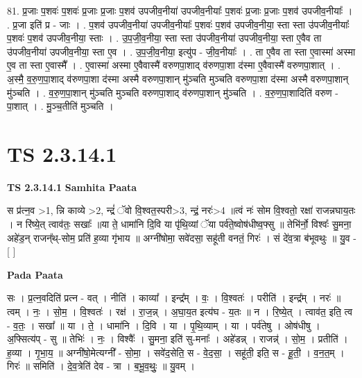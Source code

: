 \documentclass[17pt]{extarticle}
\begin{document}
81. प्र॒जाः प॒शवः॑ प॒शवः॑ प्र॒जाः प्र॒जाः प॒शव॑ उपजीव॒नीया॑ उपजीव॒नीयाः᳚ प॒शवः॑ प्र॒जाः प्र॒जाः प॒शव॑ उपजीव॒नीयाः᳚ । . प्र॒जा इति॑ प्र - जाः । . प॒शव॑ उपजीव॒नीया॑ उपजीव॒नीयाः᳚ प॒शवः॑ प॒शव॑ उपजीव॒नीया॒ स्ता स्ता उ॑पजीव॒नीयाः᳚ प॒शवः॑ प॒शव॑ उपजीव॒नीया॒ स्ताः । . उ॒प॒जी॒व॒नीया॒ स्ता स्ता उ॑पजीव॒नीया॑ उपजीव॒नीया॒ स्ता ए॒वैव ता उ॑पजीव॒नीया॑ उपजीव॒नीया॒ स्ता ए॒व । . उ॒प॒जी॒व॒नीया॒ इत्यु॑प - जी॒व॒नीयाः᳚ । . ता ए॒वैव ता स्ता ए॒वास्मा॑ अस्मा ए॒व ता स्ता ए॒वास्मै᳚ । . ए॒वास्मा॑ अस्मा ए॒वैवास्मै॑ वरुणपा॒शाद् व॑रुणपा॒शा द॑स्मा ए॒वैवास्मै॑ वरुणपा॒शात् । . अ॒स्मै॒ व॒रु॒ण॒पा॒शाद् व॑रुणपा॒शा द॑स्मा अस्मै वरुणपा॒शान् मु॑ञ्चति मुञ्चति वरुणपा॒शा द॑स्मा अस्मै वरुणपा॒शान् मु॑ञ्चति । . व॒रु॒ण॒पा॒शान् मु॑ञ्चति मुञ्चति वरुणपा॒शाद् व॑रुणपा॒शान् मु॑ञ्चति । . व॒रु॒ण॒पा॒शादिति॑ वरुण - पा॒शात् । . मु॒ञ्च॒तीति॑ मुञ्चति । \newline
\pagebreak
{}

\section{ TS 2.3.14.1 }

\textbf{TS 2.3.14.1 } \newline
\textbf{Samhita Paata} \newline

स प्र॑त्न॒व >1, न्नि काव्ये >2, न्द्रं॑ ॅवो वि॒श्वत॒स्परी>3, न्द्रं॒ नरः॑>4 ॥त्वं नः॑ सोम वि॒श्वतो॒ रक्षा॑ राजन्नघाय॒तः । न रि॑ष्ये॒त् त्वाव॑तः॒ सखाः᳚ ॥या ते॒ धामा॑नि दि॒वि या पृ॑थि॒व्यां ॅया पर्व॑ते॒ष्वोष॑धीष्व॒फ्सु ॥ तेभि॑र्नो॒ विश्वः᳚ सु॒मना॒ अहे॑ड॒न् राजन्᳚थ्-सोम॒ प्रति॑ ह॒व्या गृ॑भाय ॥ अग्नी॑षोमा॒ सवे॑दसा॒ सहू॑ती वनतं॒ गिरः॑ । सं दे॑व॒त्रा ब॑भूवथुः ॥ यु॒व - [  ] \newline

\textbf{Pada Paata} \newline

सः । प्र॒त्न॒वदिति॑ प्रत्न - वत् । नीति॑ । काव्या᳚ । इन्द्र᳚म् । वः॒ । वि॒श्वतः॑ । परीति॑ । इन्द्र᳚म् । नरः॑ ॥ त्वम् । नः॒ । सो॒म॒ । वि॒श्वतः॑ । रक्ष॑ । रा॒ज॒न्न् । अ॒घा॒य॒त इत्य॑घ - य॒तः ॥ न । रि॒ष्ये॒त् । त्वाव॑त॒ इति॒ त्व - व॒तः॒ । सखा᳚ ॥ या । ते॒ । धामा॑नि । दि॒वि । या । पृ॒थि॒व्याम् । या । पर्व॑तेषु । ओष॑धीषु । अ॒फ्सित्य॑प् - सु ॥ तेभिः॑ । नः॒ । विश्वैः᳚ । सु॒मना॒ इति॑ सु-मनाः᳚ । अहे॑डन्न् । राजन्न्॑ । सो॒म॒ । प्रतीति॑ । ह॒व्या । गृ॒भा॒य॒ ॥ अग्नी॑षो॒मेत्यग्नी᳚ - सो॒मा॒ । सवे॑द॒सेति॒ स - वे॒द॒सा॒ । सहू॑ती॒ इति॒ स - हू॒ती॒ । व॒न॒त॒म् । गिरः॑ ॥ समिति॑ । दे॒व॒त्रेति॑ देव - त्रा । ब॒भू॒व॒थुः॒ ॥ यु॒वम् ।  \newline
\end{document}
